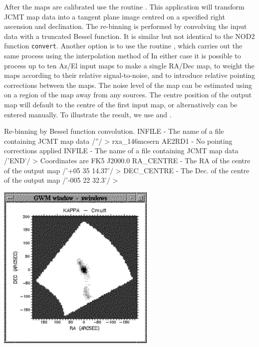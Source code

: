 \documentclass[11pt,noabs]{starlink}
\begin{document}
   After the maps are calibrated use the routine
\texttt{}.
   This application will transform JCMT map data into a tangent plane
   image centred on a specified right ascension and declination. The
   re-binning is performed by convolving the input data with a truncated
   Bessel function. It is similar but not identical to the NOD2 function
   \texttt{convert}. Another option is to use the routine
\texttt{},
   which carries out the same process using the interpolation method of
   In either case it is possible to process up to ten
   Az/El input maps to make a single RA/Dec map, to weight the maps according
   to their relative signal-to-noise, and to introduce relative pointing
   corrections between the maps. The noise level of the map can be
   estimated using
\texttt{}
   on a region of the map away from any
   sources. The centre position of the output map will default to the
   centre of the first input map, or alternatively can be entered
   manually. To illustrate
   the result, we use
\texttt{}
   and
\texttt{}.

\begin{terminalv}
Re-binning by Bessel function convolution.
INFILE - The name of a file containing JCMT map data /''/ > rxa_146mcsern
AE2RD1 - No pointing corrections applied
INFILE - The name of a file containing JCMT map data /'END'/ >
Coordinates are FK5 J2000.0
RA_CENTRE - The RA of the centre of the output map /'+05 35 14.37'/ >
DEC_CENTRE - The Dec. of the centre of the output map /'-005 22 32.3'/ >
\end{terminalv}

\begin{center}
\leavevmode\includegraphics[height=80mm]{sc1_display5}
\end{center}
\end{document}
